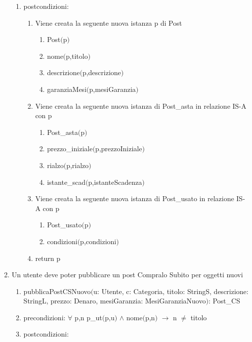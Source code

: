 \documentclass{article}
\begin{document}
\begin{enumerate}
\begin{enumerate}
        \item postcondizioni:
        \begin{enumerate}
            \item Viene creata la seguente nuova istanza p di Post
            \begin{enumerate}
                \item Post$($p$)$
                \item nome$($p,titolo$)$
                \item descrizione$($p,descrizione$)$
                \item garanziaMesi$($p,mesiGaranzia$)$
            \end{enumerate}
            \item Viene creata la seguente nuova istanza di Post\_asta in relazione IS-A con p
            \begin{enumerate}
                \item Post\_asta$($p$)$
                \item prezzo\_iniziale$($p,prezzoIniziale$)$
                \item rialzo$($p,rialzo$)$
                \item istante\_scad$($p,istanteScadenza$)$
            \end{enumerate}
            \item Viene creata la seguente nuova istanza di Post\_usato in relazione IS-A con p
            \begin{enumerate}
                \item Post\_usato$($p$)$
                \item condizioni$($p,condizioni$)$
            \end{enumerate}
            \item return p
        \end{enumerate}
    \end{enumerate}
    \newpage
    \item\label{sec:pubblicaPostCSNuovo} Un utente deve poter pubblicare un post Compralo Subito per oggetti nuovi
    \begin{enumerate}
        \item pubblicaPostCSNuovo$($u: Utente, c: Categoria, titolo: StringS, descrizione: StringL, prezzo: Denaro, mesiGaranzia: MesiGaranziaNuovo$)$: Post\_CS
        \item precondizioni: $\forall$ p,n p\_ut$($p,u$)$ $\land$ nome$($p,n$)$ $\rightarrow$ n $\neq$ titolo
        \item postcondizioni:

\end{enumerate}
\end{enumerate}
\end{document}
